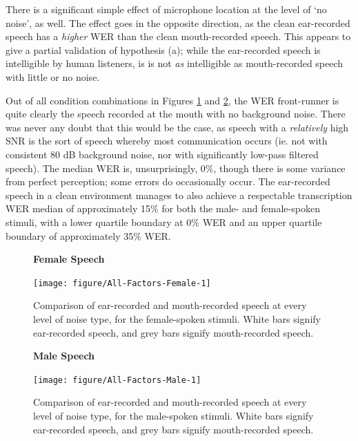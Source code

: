 There is a significant simple effect of microphone location at the level of `no noise', as well.  The effect goes in the opposite direction, as the clean ear-recorded speech has a \textit{higher} WER than the clean mouth-recorded speech.  This appears to give a partial validation of hypothesis (a); while the ear-recorded speech is intelligible by human listeners, is is not \textit{as} intelligible as mouth-recorded speech with little or no noise.

Out of all condition combinations in Figures \ref{fig:female-split} and \ref{fig:male-split}, the WER front-runner is quite clearly the speech recorded at the mouth with no background noise.  There was never any doubt that this would be the case, as speech with a \textit{relatively} high SNR is the sort of speech whereby most communication occurs (ie. not with consistent 80 dB background noise, nor with significantly low-pass filtered speech).  The median WER is, unsurprisingly, 0\%, though there is some variance from perfect perception; some errors do occasionally occur. The ear-recorded speech in a clean environment manages to also achieve a respectable transcription WER median of approximately 15\% for both the male- and female-spoken stimuli, with a lower quartile boundary at 0\% WER and an upper quartile boundary of approximately 35\% WER.


\begin{figure}[h!]
\centering
\textbf{Female Speech}

\texttt{[image: figure/All-Factors-Female-1]} 

\caption{Comparison of ear-recorded and mouth-recorded speech at every level of noise type, for the female-spoken stimuli.  White bars signify ear-recorded speech, and grey bars signify mouth-recorded speech.}\label{fig:female-split}
\end{figure}

\begin{figure}[h!]
\centering
\textbf{Male Speech}

\texttt{[image: figure/All-Factors-Male-1]} 

\caption{Comparison of ear-recorded and mouth-recorded speech at every level of noise type, for the male-spoken stimuli.  White bars signify ear-recorded speech, and grey bars signify mouth-recorded speech.}\label{fig:male-split}
\end{figure}


